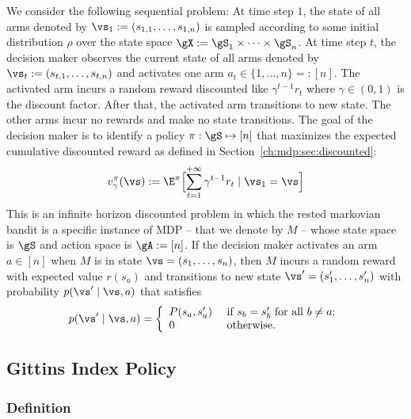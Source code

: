 We consider the following sequential problem: At time step $1$, the state of all arms denoted by $\vs_1:=(s_{1,1},\dots,s_{1,n})$ is sampled according to some initial distribution $\rho$ over the state space $\gX:=\gS_1\times\dots\times\gS_n$.
At time step $t$, the decision maker observes the current state of all arms denoted by $\vs_t:=(s_{t,1},\dots,s_{t,n})$ and activates one arm $a_t\in\{1,\dots,n\}=:[n]$.
The activated arm incurs a random reward discounted like $\gamma^{t-1}r_t$ where $\gamma\in(0,1)$ is the discount factor.
After that, the activated arm transitions to new state. %
The other arms incur no rewards and make no state transitions.
The goal of the decision maker is to identify a policy $\pi:\gS\mapsto[n]$ that maximizes the expected cumulative discounted reward as defined in Section~\ref{ch:mdp:sec:discounted}:
\begin{equation}
    \label{ch:mb:value}
    v_\gamma^\pi(\vs):=\E^\pi\Bigl[\sum_{t=1}^{+\infty} \gamma^{t-1}r_t \mid \vs_1=\vs\Bigr]
\end{equation}
This is an infinite horizon discounted problem in which the rested markovian bandit is a specific instance of MDP -- that we denote by $M$ -- whose state space is $\gS$ and action space is $\gA:=[n]$.
If the decision maker activates an arm $a\in[n]$ when $M$ is in state $\vs=(s_1,\dots,s_n)$, then $M$ incurs a random reward with expected value $r(s_a)$ and transitions to new state $\vs'=(s'_1,\dots,s'_n)$ with probability $p(\vs'\mid \vs, a)$ that satisfies
\begin{equation}
    \label{ch:mb:defP}
    p(\vs'\mid \vs, a)
    = 
    \left\{
        \begin{array}{ll}
            P(s_a,s'_a) & \text{ if $s_b=s'_b$ for all $b\ne a$;}\\
            0 &\text{ otherwise}.
        \end{array}
    \right.
\end{equation}

\subsection{Gittins Index Policy}
\label{subsec:gittins_idx}

\subsubsection{Definition}

